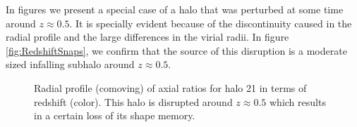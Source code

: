 In figures \label{fig:RedshiftDMbad} we present a special case of a halo that was perturbed at some time around $z\approx 0.5$. It is specially evident because of the discontinuity caused in the radial profile and the large differences in the virial radii. In figure \ref{fig:RedshiftSnaps}, we confirm that the source of this disruption is a moderate sized infalling subhalo around $z\approx 0.5$.  \\  


\begin{figure}[!ht]
  \centering
  \hfill
  \caption{Radial profile (comoving) of axial ratios for halo 21 in terms of redshift (color). This halo is disrupted around $z \approx 0.5$ which results in a certain loss of its shape memory.}
  \label{fig:RedshiftBad}
\end{figure}

